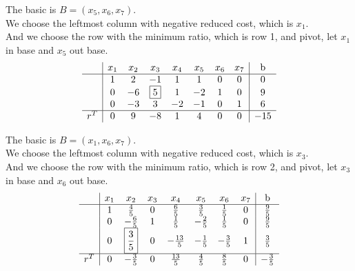 \documentclass[10pt]{article}
\begin{document}
The basic is $B=(x_5,x_6,x_7)$.\\
We choose the leftmost column with negative reduced cost, which is $x_1$.\\
And we choose the row with the minimum ratio, which is row 1, and pivot, let $x_1$ in base and $x_5$ out base.\\

\begin{equation}
	\begin{aligned}
		\begin{array}{c|ccccccc|c}
			& x_1 & x_2 & x_3 & x_4 & x_5 & x_6 & x_7 & \text{b} \\
			\hline
			& 1 & 2 & -1 & 1 & 1 & 0 & 0 & 0 \\
			& 0 & -6 & \boxed{5} & 1 & -2 & 1 & 0 & 9 \\
			& 0 & -3 & 3 & -2 & -1 & 0 & 1 & 6 \\
			\hline
			r^T & 0 & 9 & -8 & 1 & 4 & 0 & 0 & -15 \\
		\end{array}
	\end{aligned}
\end{equation}

The basic is $B=(x_1,x_6,x_7)$.\\
We choose the leftmost column with negative reduced cost, which is $x_3$.\\
And we choose the row with the minimum ratio, which is row 2, and pivot, let $x_3$ in base and $x_6$ out base.\\

\begin{equation}
	\begin{aligned}
		\begin{array}{c|ccccccc|c}
			& x_1 & x_2 & x_3 & x_4 & x_5 & x_6 & x_7 & \text{b} \\
			\hline
			& 1 & \frac{4}{5} & 0 & \frac{6}{5} & \frac{3}{5} & \frac{1}{5} & 0 & \frac{9}{5} \\
			& 0 & -\frac{6}{5} & 1 & \frac{1}{5} & -\frac{2}{5} & \frac{1}{5} & 0 & \frac{9}{5} \\
			& 0 & \boxed{\frac{3}{5}} & 0 & -\frac{13}{5} & -\frac{1}{5} & -\frac{3}{5} & 1 & \frac{3}{5} \\
			\hline
			r^T & 0 & -\frac{3}{5} & 0 & \frac{13}{5} & \frac{4}{5} & \frac{8}{5} & 0 & -\frac{3}{5} \\
		\end{array}
	\end{aligned}
\end{equation}
\end{document}
